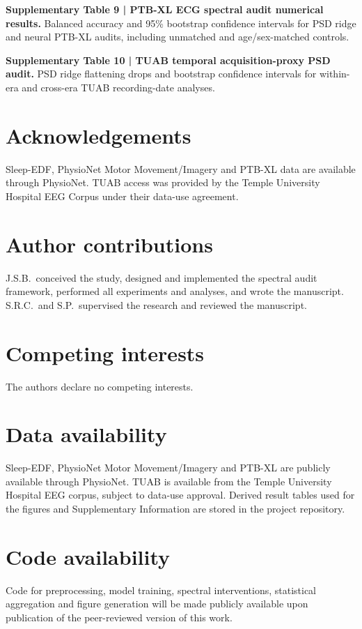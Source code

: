 \documentclass[pdflatex,sn-nature]{sn-jnl}
\begin{document}
\textbf{Supplementary Table 9 | PTB-XL ECG spectral audit numerical results.} Balanced accuracy and 95\% bootstrap confidence intervals for PSD ridge and neural PTB-XL audits, including unmatched and age/sex-matched controls.

\textbf{Supplementary Table 10 | TUAB temporal acquisition-proxy PSD audit.} PSD ridge flattening drops and bootstrap confidence intervals for within-era and cross-era TUAB recording-date analyses.

\section*{Acknowledgements}

Sleep-EDF, PhysioNet Motor Movement/Imagery and PTB-XL data are available through PhysioNet. TUAB access was provided by the Temple University Hospital EEG Corpus under their data-use agreement.

\section*{Author contributions}

J.S.B.\ conceived the study, designed and implemented the spectral audit framework, performed all experiments and analyses, and wrote the manuscript. S.R.C.\ and S.P.\ supervised the research and reviewed the manuscript.

\section*{Competing interests}

The authors declare no competing interests.

\section*{Data availability}

Sleep-EDF, PhysioNet Motor Movement/Imagery and PTB-XL are publicly available through PhysioNet. TUAB is available from the Temple University Hospital EEG corpus, subject to data-use approval. Derived result tables used for the figures and Supplementary Information are stored in the project repository.

\section*{Code availability}

Code for preprocessing, model training, spectral interventions, statistical aggregation and figure generation will be made publicly available upon publication of the peer-reviewed version of this work.


\end{document}
